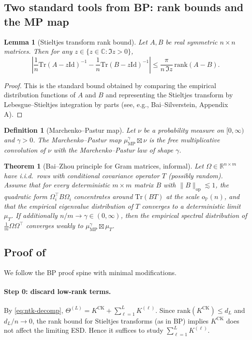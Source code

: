 \documentclass[11pt]{article}
\newcommand{\RR}{\mathbb{R}}
\newcommand{\CC}{\mathbb{C}}
\newcommand{\PP}{\mathbb{P}}
\newcommand{\Id}{\mathrm{Id}}
\newcommand{\tr}{\mathrm{Tr}}
\newcommand{\Cplus}{\{z\in\CC:\Im z>0\}}
\newtheorem{theorem}{Theorem}
\newtheorem{definition}{Definition}
\newtheorem{lemma}{Lemma}
\begin{document}
\subsection{Two standard tools from BP: rank bounds and the MP map}

\begin{lemma}[Stieltjes transform rank bound]\label{lem:stieltjes-rank}
Let $A,B$ be real symmetric $n\times n$ matrices.
Then for any $z\in\Cplus$,
\[
  \left|
  \frac{1}{n}\tr(A-z\Id)^{-1}-\frac{1}{n}\tr(B-z\Id)^{-1}
  \right|
  \leq \frac{\pi}{n\,\Im z}\,\mathrm{rank}(A-B).
\]
\end{lemma}
\begin{proof}
This is the standard bound obtained by comparing the empirical distribution functions of $A$ and $B$ and representing the Stieltjes transform by Lebesgue--Stieltjes integration by parts (see, e.g., Bai--Silverstein, Appendix A).
\end{proof}

\begin{definition}[Marchenko--Pastur map]\label{def:mp-map}
Let $\nu$ be a probability measure on $[0,\infty)$ and $\gamma>0$.
The \emph{Marchenko--Pastur map} $\mu_{\mathrm{MP}}^{\gamma}\boxtimes \nu$ is the free multiplicative convolution of $\nu$ with the Marchenko--Pastur law of shape $\gamma$.
\end{definition}

\begin{theorem}[Bai--Zhou principle for Gram matrices, informal]\label{thm:baizhou-informal}
Let $\Omega\in\RR^{n\times m}$ have i.i.d.\ rows with conditional covariance operator $T$ (possibly random).
Assume that for every deterministic $m\times m$ matrix $B$ with $\|B\|_{\mathrm{op}}\lesssim 1$, the quadratic form $\Omega_i^\top B\Omega_i$ concentrates around $\tr(BT)$ at the scale $o_{\PP}(n)$, and that the empirical eigenvalue distribution of $T$ converges to a deterministic limit $\mu_T$.
If additionally $n/m\to\gamma\in(0,\infty)$, then the empirical spectral distribution of $\frac{1}{m}\Omega\Omega^\top$ converges weakly to $\mu_{\mathrm{MP}}^{\gamma}\boxtimes \mu_T$.
\end{theorem}

\subsection*{Proof of }
We follow the BP proof spine with minimal modifications.

\paragraph{Step 0: discard low-rank terms.}
By \eqref{eq:ntk-decomp}, $\Theta^{(L)}=K^{\mathrm{CK}}+\sum_{\ell=1}^L K^{(\ell)}$.
Since $\mathrm{rank}(K^{\mathrm{CK}})\le d_L$ and $d_L/n\to 0$, the rank bound for Stieltjes transforms (as in BP) implies $K^{\mathrm{CK}}$ does not affect the limiting ESD.
Hence it suffices to study $\sum_{\ell=1}^L K^{(\ell)}$.
\end{document}
